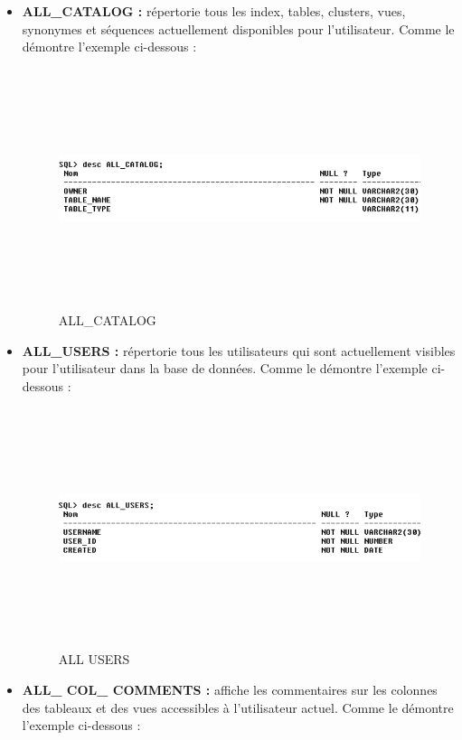 \begin{enumerate}
        \begin{itemize}
        \item [\textbullet]\textbf{ALL\_CATALOG :}
         répertorie tous les index, tables, clusters, vues, synonymes et séquences actuellement disponibles pour l’utilisateur. Comme le démontre l’exemple ci-dessous :
            \begin{figure}[h]
            \centering
            \includegraphics[width=14cm, height=7cm]{ALL_CATALOG.png}
            \caption{ALL\_CATALOG }
            \end{figure}
        \item [\textbullet]\textbf{ALL\_USERS :} répertorie tous les utilisateurs qui sont actuellement visibles pour l’utilisateur dans la base de données. Comme le démontre l’exemple ci-dessous :
            \begin{figure}[h]
            \centering
            \includegraphics[width=14cm, height=7cm]{ALL_USERS.png}
            \caption{ALL USERS }
            \end{figure}
        \item [\textbullet]\textbf{ALL\_ COL\_ COMMENTS :} affiche les commentaires sur les colonnes des tableaux et des vues accessibles à l’utilisateur actuel. Comme le démontre l’exemple ci-dessous :\\

\end{itemize}
\end{enumerate}
